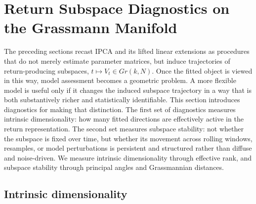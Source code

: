 \documentclass[11pt,letterpaper]{article}
\newcommand{\gr}{\mathrm{Gr}}
\begin{document}
\section{Return Subspace Diagnostics on the Grassmann Manifold}
\label{sec:ret_subspaces}


The preceding sections recast IPCA and its lifted linear extensions as procedures that do not merely estimate parameter matrices, but induce trajectories of return-producing subspaces, $t \mapsto V_t \in Gr(k,N)$. Once the fitted object is viewed in this way, model assessment becomes a geometric problem. A more flexible model is useful only if it changes the induced subspace trajectory in a way that is both substantively richer and statistically identifiable. This section introduces diagnostics for making that distinction. The first set of diagnostics measures intrinsic dimensionality: how many fitted directions are effectively active in the return representation. The second set measures subspace stability: not whether the subspace is fixed over time, but whether its movement across rolling windows, resamples, or model perturbations is persistent and structured rather than diffuse and noise-driven. We measure intrinsic dimensionality through effective rank, and subspace stability through principal angles and Grassmannian distances.

\subsection{Intrinsic dimensionality}
\label{subsec:intrinsic-dimensionality}
\end{document}
